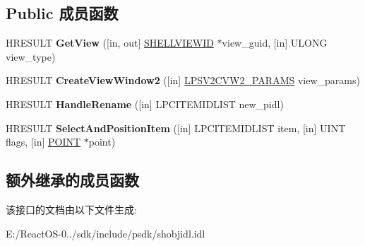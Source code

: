 \subsection*{Public 成员函数}
\begin{DoxyCompactItemize}
\item 
\mbox{\label{interface_i_shell_view2_a941141d702e0cd7bcc4038e2943078f8}} 
H\+R\+E\+S\+U\+LT {\bfseries Get\+View} (\mbox{[}in, out\mbox{]} \hyperlink{interface_g_u_i_d}{S\+H\+E\+L\+L\+V\+I\+E\+W\+ID} $\ast$view\+\_\+guid, \mbox{[}in\mbox{]} U\+L\+O\+NG view\+\_\+type)
\item 
\mbox{\label{interface_i_shell_view2_a8498b82e93321fed84126620a1a4d1cf}} 
H\+R\+E\+S\+U\+LT {\bfseries Create\+View\+Window2} (\mbox{[}in\mbox{]} \hyperlink{struct_i_shell_view2_1_1___s_v2_c_v_w2___p_a_r_a_m_s}{L\+P\+S\+V2\+C\+V\+W2\+\_\+\+P\+A\+R\+A\+MS} view\+\_\+params)
\item 
\mbox{\label{interface_i_shell_view2_ac2bdeaeed8211dea51b9f04452bd7f23}} 
H\+R\+E\+S\+U\+LT {\bfseries Handle\+Rename} (\mbox{[}in\mbox{]} L\+P\+C\+I\+T\+E\+M\+I\+D\+L\+I\+ST new\+\_\+pidl)
\item 
\mbox{\label{interface_i_shell_view2_a159ba2448a328d17de569bf7f4822780}} 
H\+R\+E\+S\+U\+LT {\bfseries Select\+And\+Position\+Item} (\mbox{[}in\mbox{]} L\+P\+C\+I\+T\+E\+M\+I\+D\+L\+I\+ST item, \mbox{[}in\mbox{]} U\+I\+NT flags, \mbox{[}in\mbox{]} \hyperlink{structtag_p_o_i_n_t}{P\+O\+I\+NT} $\ast$point)
\end{DoxyCompactItemize}
\subsection*{额外继承的成员函数}


该接口的文档由以下文件生成\+:\begin{DoxyCompactItemize}
\item 
E\+:/\+React\+O\+S-\/0../sdk/include/psdk/shobjidl.\+idl\end{DoxyCompactItemize}

